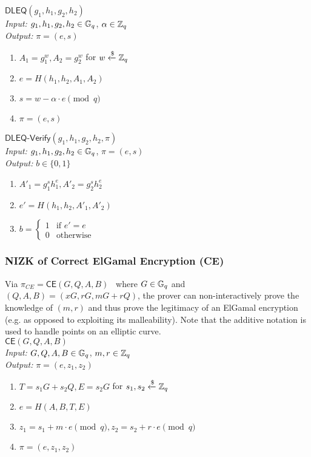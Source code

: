 \noindent\underline{$\mathsf{DLEQ}(g_1, h_1, g_2, h_2)$}\\
\textit{Input:} $g_1, h_1, g_2, h_2 \in \mathbb{G}_q$, $\alpha \in \mathbb{Z}_q$\\
\textit{Output:} $\pi = (e, s)$
\vspace{-\topsep}
\begin{enumerate}
\item $A_1 = g_1^w, A_2 = g_2^w$ for $w \xleftarrow{\$} \mathbb{Z}_q$
\item $e = H(h_1, h_2, A_1, A_2)$
\item $s = w - \alpha \cdot e \pmod q$
\item $\pi = (e, s)$
\end{enumerate}

\noindent\underline{$\mathsf{DLEQ}\text{-}\mathsf{Verify}(g_1, h_1, g_2, h_2, \pi)$}\\
\textit{Input:} $g_1, h_1, g_2, h_2 \in \mathbb{G}_q$, $\pi = (e, s)$\\
\textit{Output:} $b \in \{0, 1\}$
\vspace{-\topsep}
\begin{enumerate}
\item $A'_1 = g_1^s h_1^e, A'_2 = g_2^s h_2^e$
\item $e' = H(h_1, h_2, A'_1, A'_2)$
\item $b = \begin{cases}
1 & \text{if $e' = e$}\\
0 & \text{otherwise}
\end{cases}$
\end{enumerate}

\iffalse
\subsubsection{NIZK of Correct ElGamal Encryption (CE)}
\label{appendix:ce}
Via $\pi_{CE} = \mathsf{CE}(G, Q, A, B)$~\cite{cherniaeva2019homomorphic} where $G \in \mathbb{G}_q$ and $(Q, A, B) = (x G, r G, m G + r Q)$, the prover can non-interactively prove the knowledge of $(m, r)$ and thus prove the legitimacy of an ElGamal encryption (e.g. as opposed to exploiting its malleability). Note that the additive notation is used to handle points on an elliptic curve.\\

\noindent\underline{$\mathsf{CE}(G, Q, A, B)$}\\
\textit{Input:} $G, Q, A, B \in \mathbb{G}_q$, $m, r \in \mathbb{Z}_q$\\
\textit{Output:} $\pi = (e, z_1, z_2)$
\vspace{-\topsep}
\begin{enumerate}
\item $T = s_1 G + s_2 Q, E = s_2 G$ for $s_1, s_2 \xleftarrow{\$} \mathbb{Z}_q$
\item $e = H(A, B, T, E)$
\item $z_1 = s_1 + m \cdot e \pmod q, z_2 = s_2 + r \cdot e \pmod q$
\item $\pi = (e, z_1, z_2)$
\end{enumerate}

